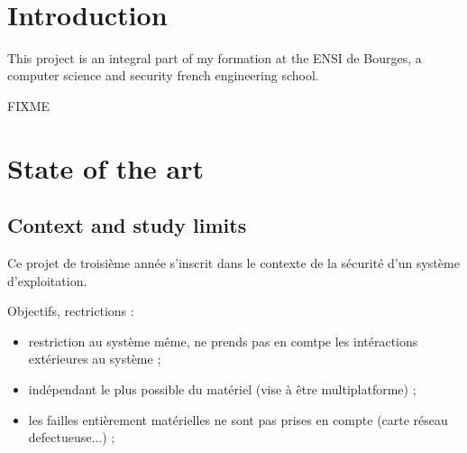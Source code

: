 \documentclass[pdftex,a4paper,titlepage,11pt]{article}
\begin{document}
~

\newpage

\tableofcontents

\newpage

\listoffigures

\newpage

\section*{Introduction} 

This project is an integral part of my formation at the ENSI de Bourges, a computer science and security french engineering school.

FIXME

%
%

\newpage

\section{State of the art}

\subsection{Context and study limits}

Ce projet de troisième année s'inscrit dans le contexte de la sécurité d'un système d'exploitation.

Objectifs, rectrictions :
\begin{itemize}
	\item restriction au système même, ne prends pas en comtpe les intéractions extérieures au système ;
	\item indépendant le plus possible du matériel (vise à être multiplatforme) ;
	\item les failles entièrement matérielles ne sont pas prises en compte (carte réseau defectueuse...) ;
\end{itemize}
\end{document}
